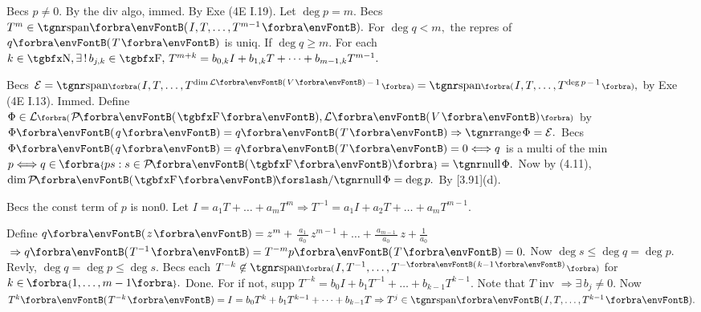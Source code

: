 Becs $p\neq 0.$ By the div algo, immed.  \;\;\Or By Exe (4E I.19).\PfEnd\vspace{2pt}\parSol{}
\Or Let $\deg p=m.$ Becs $T^{m}\in\Span{I,T,\dots,T^{m-1}}.$ For $\deg q<m,$ the repres of $q\Par{T}$ is uniq.\parSol{}
If $\deg q\geqslant m.$ For each $k\in\Nbb,\exists\,!\,b_{j,k}\in\Fbb,\,T^{m+k}=b_{0,k}I+b_{1,k}T+\dots+b_{m-1,k}T^{m-1}.$\PfEnd
\SepLine[0pt][\Blind{\BulletPointX} ]

Becs $\mE=\Span[\BigPar]{I,T,\dots,T^{\dim\Lm[\SmallPar]{V}\,-\,1}}=\Span[\BigPar]{I,T,\dots,T^{\deg p\,-\,1}},$ by Exe (4E I.13). Immed.\PfEnd\vspace{2pt}\parSol{}
\Or Define $\Phi\in\Lm[\BigPar]{\PoFi,\Lm{V}}$ by $\Phi\Par{q}=q\Par{T}\Rightarrow\range\Phi=\mE.$\parSol{}
Becs $\Phi\Par{q}=q\Par{T}=0\Longleftrightarrow q$ is a multi of the min $p\Longleftrightarrow q\in\;\!\!\Bra{ps:s\in\PoFi}=\null\Phi.$\parSol{}
Now by (4.11), $\dim\PoFi\XSlash\null\Phi=\deg p.$ By [3.91](d).\PfEnd
\SepLine[0pt][\Blind{\BulletPointX} ]

Becs the const term of $p$ is non0. Let $I=a_1T+\dots+a_mT^m\Rightarrow T^{-1}=a_1I+a_2T+\dots+a_mT^{m-1}.$\PfEnd
\SepLine[0pt][\Blind{\BulletPointX} ]

Define $q\Par{z}=z^m+{}${\Large$\frac{\:a_1\:}{a_0}$}$\,z^{m-1}+\dots+{}${\Large$\frac{\:a_{m-1}\:}{a_0}$}$\,z+{}${\Large$\frac{\:1\:}{a_0}$}${}\Rightarrow q\Par{T^{-1}}=T^{-m}p\Par{T}=0.$\vspace{2pt}\parSol{}
Now $\deg s\leqslant\deg q=\deg p.$ \;Revly, $\deg q=\deg p\leqslant\deg s.$\PfEnd\vspace{4pt}\parSol{}
\Or Becs each $T^{-k}\not\in\Span[\BigPar]{I,T^{-1},\dots,T^{-\SmallPar{k-1}}}$ for $k\in\;\!\!\Bra{1,\dots,m-1}.$ Done.\parSol{}
For if not, supp $T^{-k}=b_0 I+b_1 T^{-1}+\dots+b_{k-1}T^{k-1}.$ Note that $T$ inv $\Rightarrow\exists\,b_j\neq 0.$\parSol{}
Now $T^k\Par{T^{-k}}=I=b_0 T^k+b_1 T^{k-1}+\dots+b_{k-1}T\Rightarrow T^j\in\Span{I,T,\dots,T^{k-1}}.$\PfEnd
\SepLine[0pt][\Blind{\BulletPointX} ]

